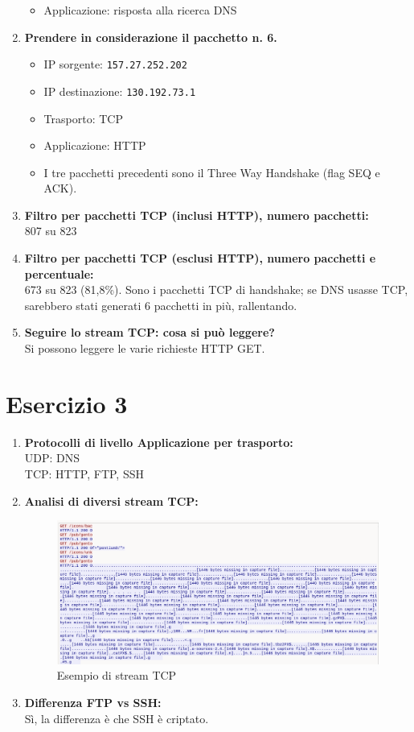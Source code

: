 \documentclass[a4paper,12pt]{article}
\begin{document}
\begin{enumerate}
\begin{itemize}
      \item Applicazione: risposta alla ricerca DNS
    \end{itemize}
  \item \textbf{Prendere in considerazione il pacchetto n. 6.}\\
    \begin{itemize}
      \item IP sorgente: \texttt{157.27.252.202}
      \item IP destinazione: \texttt{130.192.73.1}
      \item Trasporto: TCP
      \item Applicazione: HTTP
      \item I tre pacchetti precedenti sono il Three Way Handshake (flag SEQ e ACK).
    \end{itemize}
  \item \textbf{Filtro per pacchetti TCP (inclusi HTTP), numero pacchetti:}\\
    807 su 823
  \item \textbf{Filtro per pacchetti TCP (esclusi HTTP), numero pacchetti e percentuale:}\\
    673 su 823 (81,8\%). Sono i pacchetti TCP di handshake; se DNS usasse TCP, sarebbero stati generati 6 pacchetti in più, rallentando.
  \item \textbf{Seguire lo stream TCP: cosa si può leggere?}\\
    Si possono leggere le varie richieste HTTP GET.
\end{enumerate}

\section*{Esercizio 3}
\begin{enumerate}
  \item \textbf{Protocolli di livello Applicazione per trasporto:}\\
    UDP: DNS \\
    TCP: HTTP, FTP, SSH
  \item \textbf{Analisi di diversi stream TCP:}\\
    \begin{figure}[h]
      \centering
      \includegraphics[width=0.8\linewidth]{src/streamTCP.png}
      \caption{Esempio di stream TCP}
    \end{figure}
  \item \textbf{Differenza FTP vs SSH:}\\
    Sì, la differenza è che SSH è criptato.
\end{enumerate}
\end{document}
